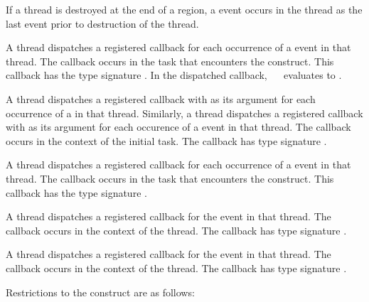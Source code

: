 If a thread is destroyed at the end of a  region, a
 event occurs in the thread as the last
event prior to destruction of the thread.

\tools

A thread dispatches a registered 
callback for each occurrence of a  event in that
thread.  The callback occurs in the task that encounters the 
 construct.  This callback has the type signature
. In the dispatched callback, 
~\code{&}~ evaluates to .

A thread dispatches a registered 
callback with  as its  argument
for each occurrence of a  in that thread.
Similarly, a thread dispatches a registered 
callback with  as its  argument
for each occurence of a  event in that thread. 
The callback occurs in the context of the initial task.  The callback 
has type signature .

A thread dispatches a registered 
callback for each occurrence of a  event in that
thread.  The callback occurs in the task that encounters
the  construct.  This callback has the type signature
.

A thread dispatches a registered 
callback for the  event in that thread.
The callback occurs in the context of the thread.  The callback 
has type signature .

A thread dispatches a registered 
callback for the  event in that thread. The callback 
occurs in the context of the thread.  The callback has type signature
.

\restrictions
Restrictions to the  construct are as follows:

